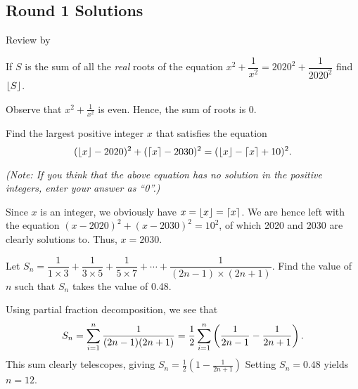 \subsection{Round 1 Solutions}\label{S::2020-O-1}

\begin{resources}
    Review by 
\end{resources}

\begin{question}[0]\label{Q::2020-O-1-1}
    If $S$ is the sum of all the \textit{real} roots of the equation $x^2 + \dfrac{1}{x^2} = 2020^2 + \dfrac{1}{2020^2}$ find $\left\lfloor S \right\rfloor$.
\end{question}
\begin{solution*}
    Observe that $x^2 + \frac1{x^2}$ is even. Hence, the sum of roots is 0.
\end{solution*}

\begin{question}[2030]\label{Q::2020-O-1-2}
    Find the largest positive integer $x$ that satisfies the equation \[(\left\lfloor x \right\rfloor - 2020)^2 + (\left\lceil x \right\rceil - 2030)^2 = (\left\lfloor x \right\rfloor - \left\lceil x \right\rceil + 10)^2.\]

    \noindent\textit{(Note: If you think that the above equation has no solution in the positive integers, enter your answer as ``0''.)}
\end{question}
\begin{solution*}
    Since $x$ is an integer, we obviously have $x = \left\lfloor x \right\rfloor = \left\lceil x \right\rceil$. We are hence left with the equation $(x - 2020)^2 + (x - 2030)^2 = 10^2$, of which 2020 and 2030 are clearly solutions to. Thus, $x = 2030$.
\end{solution*}

\begin{question}[12]\label{Q::2020-O-1-3}
    Let $S_n = \dfrac1{1 \times 3} + \dfrac{1}{3 \times 5} + \dfrac1{5 \times 7} + \cdots + \dfrac{1}{(2n-1) \times (2n+1)}$. Find the value of $n$ such that $S_n$ takes the value of 0.48.
\end{question}
\begin{solution*}
    Using partial fraction decomposition, we see that \[S_n = \sum_{i = 1}^{n} \frac{1}{(2n-1)(2n+1)} = \frac12 \sum_{i = 1}^n \left( \frac{1}{2n-1} - \frac{1}{2n+1} \right).\] This sum clearly telescopes, giving $S_n = \frac12 (1 - \frac{1}{2n + 1})$ Setting $S_n = 0.48$ yields $n = 12$.
\end{solution*}

